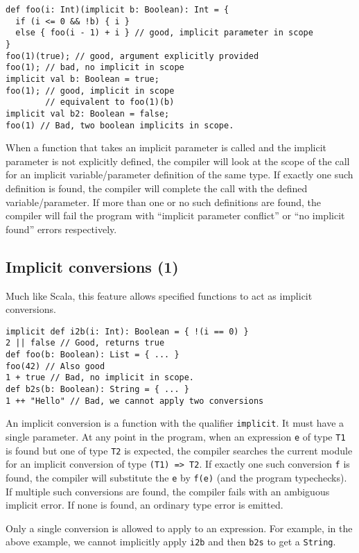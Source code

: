 \begin{lstlisting}
def foo(i: Int)(implicit b: Boolean): Int = {
  if (i <= 0 && !b) { i }
  else { foo(i - 1) + i } // good, implicit parameter in scope
}
foo(1)(true); // good, argument explicitly provided
foo(1); // bad, no implicit in scope
implicit val b: Boolean = true;
foo(1); // good, implicit in scope
        // equivalent to foo(1)(b)
implicit val b2: Boolean = false;
foo(1) // Bad, two boolean implicits in scope.
\end{lstlisting}


When a function that takes an implicit parameter is called
and the implicit parameter is not explicitly defined,
the compiler will look at the scope of the call for an implicit
variable/parameter definition of the same type.
If exactly one such definition is found, the compiler
will complete the call with the defined variable/parameter.
If more than one or no such definitions are found,
the compiler will fail the program with
``implicit parameter conflict'' or ``no implicit found''
errors respectively.

\subsection{Implicit conversions (1)}
Much like Scala, this feature allows specified functions to act as implicit conversions.

\begin{lstlisting}
implicit def i2b(i: Int): Boolean = { !(i == 0) }
2 || false // Good, returns true
def foo(b: Boolean): List = { ... }
foo(42) // Also good
1 + true // Bad, no implicit in scope.
def b2s(b: Boolean): String = { ... }
1 ++ "Hello" // Bad, we cannot apply two conversions
\end{lstlisting}

An implicit conversion is a function with the qualifier \lstinline{implicit}.
It must have a single parameter.
At any point in the program, when an expression \lstinline{e} of type \lstinline{T1} is found
but one of type \lstinline{T2} is expected,
the compiler searches the current module for an implicit conversion
of type \lstinline{(T1) => T2}.
If exactly one such conversion \lstinline{f} is found,
the compiler will substitute the \lstinline{e} by \lstinline{f(e)}
(and the program typechecks).
If multiple such conversions are found,
the compiler fails with an ambiguous implicit error.
If none is found, an ordinary type error is emitted.

Only a single conversion is allowed to apply to an expression.
For example, in the above example, we cannot implicitly apply
\lstinline{i2b} and then \lstinline{b2s} to get a \lstinline{String}.


